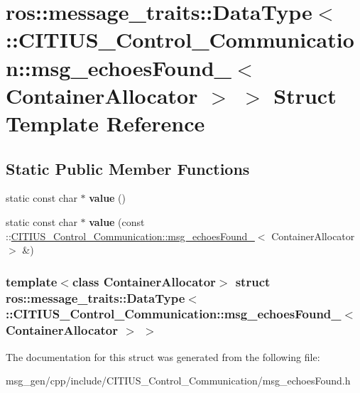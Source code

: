 \hypertarget{structros_1_1message__traits_1_1_data_type_3_01_1_1_c_i_t_i_u_s___control___communication_1_1msg5c6b2fc9e24c7ca8240190efb4ca42d4}{\section{ros\-:\-:message\-\_\-traits\-:\-:\-Data\-Type$<$ \-:\-:\-C\-I\-T\-I\-U\-S\-\_\-\-Control\-\_\-\-Communication\-:\-:msg\-\_\-echoes\-Found\-\_\-$<$ \-Container\-Allocator $>$ $>$ \-Struct \-Template \-Reference}
\label{structros_1_1message__traits_1_1_data_type_3_01_1_1_c_i_t_i_u_s___control___communication_1_1msg5c6b2fc9e24c7ca8240190efb4ca42d4}
}
\subsection*{\-Static \-Public \-Member \-Functions}
\begin{DoxyCompactItemize}
\item 
\hypertarget{structros_1_1message__traits_1_1_data_type_3_01_1_1_c_i_t_i_u_s___control___communication_1_1msg5c6b2fc9e24c7ca8240190efb4ca42d4_a7924c939017ecc9d7636a57e16de1614}{static const char $\ast$ {\bfseries value} ()}\label{structros_1_1message__traits_1_1_data_type_3_01_1_1_c_i_t_i_u_s___control___communication_1_1msg5c6b2fc9e24c7ca8240190efb4ca42d4_a7924c939017ecc9d7636a57e16de1614}

\item 
\hypertarget{structros_1_1message__traits_1_1_data_type_3_01_1_1_c_i_t_i_u_s___control___communication_1_1msg5c6b2fc9e24c7ca8240190efb4ca42d4_a4dcfeaf4c3ba43f4a512c8efbe78b5aa}{static const char $\ast$ {\bfseries value} (const \-::\hyperlink{struct_c_i_t_i_u_s___control___communication_1_1msg__echoes_found__}{\-C\-I\-T\-I\-U\-S\-\_\-\-Control\-\_\-\-Communication\-::msg\-\_\-echoes\-Found\-\_\-}$<$ \-Container\-Allocator $>$ \&)}\label{structros_1_1message__traits_1_1_data_type_3_01_1_1_c_i_t_i_u_s___control___communication_1_1msg5c6b2fc9e24c7ca8240190efb4ca42d4_a4dcfeaf4c3ba43f4a512c8efbe78b5aa}

\end{DoxyCompactItemize}
\subsubsection*{template$<$class Container\-Allocator$>$ struct ros\-::message\-\_\-traits\-::\-Data\-Type$<$ \-::\-C\-I\-T\-I\-U\-S\-\_\-\-Control\-\_\-\-Communication\-::msg\-\_\-echoes\-Found\-\_\-$<$ Container\-Allocator $>$ $>$}



\-The documentation for this struct was generated from the following file\-:\begin{DoxyCompactItemize}
\item 
msg\-\_\-gen/cpp/include/\-C\-I\-T\-I\-U\-S\-\_\-\-Control\-\_\-\-Communication/msg\-\_\-echoes\-Found.\-h\end{DoxyCompactItemize}
